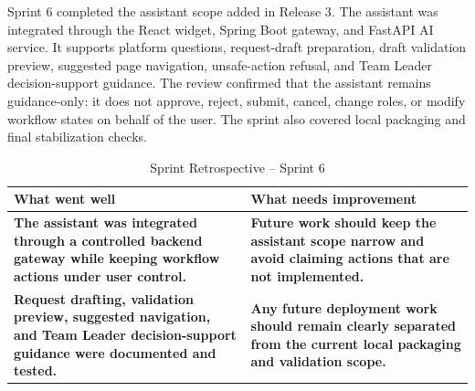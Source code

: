  \clearpage


  {\fontsize{12}{18}\selectfont
  \setlength{\parindent}{1.2cm}
  \setlength{\parskip}{6pt}

  \indent Sprint 6 completed the assistant scope added in Release 3. The assistant was integrated through the React widget, Spring Boot gateway, and FastAPI AI service. \cite{fastapi_docs} It supports platform questions, request-draft preparation, draft validation preview, suggested page navigation, unsafe-action refusal, and Team Leader decision-support guidance. The review confirmed that the assistant remains guidance-only: it does not approve, reject, submit, cancel, change roles, or modify workflow states on behalf of the user. The sprint also covered local packaging and final stabilization checks.

  }


  {\fontsize{12}{18}\selectfont
  \setlength{\parindent}{1.2cm}
  \setlength{\parskip}{6pt}

  \begin{table}[H]
  \centering
  \renewcommand{\arraystretch}{1.5}
  \setlength{\tabcolsep}{6pt}
  \begin{tabular}{|>{\centering\bfseries\arraybackslash}m{5.2cm}|>{\centering\bfseries\arraybackslash}m{5.2cm}|}
  \hline
  \rowcolor{blue!20}
  \textbf{What went well} & \textbf{What needs improvement} \\
  \hline
  The assistant was integrated through a controlled backend gateway while keeping workflow actions under user control.
  &
  Future work should keep the assistant scope narrow and avoid claiming actions that are not implemented.
  \\
  \hline
  Request drafting, validation preview, suggested navigation, and Team Leader decision-support guidance were documented and tested.
  &
  Any future deployment work should remain clearly separated from the current local packaging and validation scope.
  \\
  \hline
  \end{tabular}
  \caption{Sprint Retrospective -- Sprint 6}
  \label{tab:sprint6_retrospective}
  \end{table}

  }


